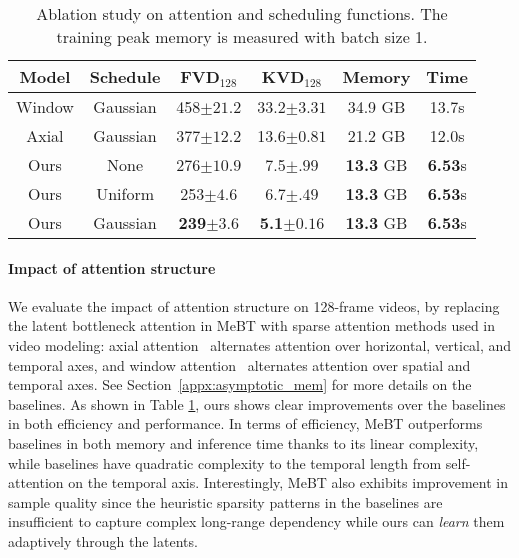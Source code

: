 \documentclass[10pt,twocolumn,letterpaper]{article}
\newcommand{\cutparagraphup}{\vspace*{-0.1in}}
\begin{document}
\begin{table}[t]
\caption{Ablation study on attention and scheduling functions. The training peak memory is measured with batch size 1.}
\label{tab:128f_ablation}
\vspace{-0.3cm}
    \centering
    \footnotesize
    \begin{tabular}{cc|cccc}
    \toprule
        Model & Schedule & FVD$_{128}$ & KVD$_{128}$ & Memory & Time\\
    \midrule
        Window & Gaussian & 458\tiny$\pm21.2$ & 33.2\tiny$\pm3.31$ & 34.9 GB & 13.7s\\
        Axial & Gaussian & 377\tiny$\pm12.2$& 13.6\tiny$\pm0.81$ & 21.2 GB & 12.0s \\
\hline
        Ours & None & 276\tiny{$\pm10.9$} & 7.5\tiny{$\pm.99$} & \textbf{13.3} GB & \textbf{6.53}s\\
        Ours & Uniform & 253\tiny{$\pm4.6$} & 6.7\tiny{$\pm.49$} & \textbf{13.3} GB & \textbf{6.53}s\\
        \hline
        Ours & Gaussian & \textbf{239\tiny${\pm3.6}$} & \textbf{5.1}\tiny$\pm0.16$ & \textbf{13.3} GB & \textbf{6.53}s\\
    \bottomrule
    \end{tabular}
\vspace{-0.5cm}
\end{table}

\cutparagraphup
\paragraph{Impact of attention structure}
We evaluate the impact of attention structure on 128-frame videos, by replacing the latent bottleneck attention in MeBT with sparse attention methods used in video modeling: axial attention~\cite{Ho2019} alternates attention over horizontal, vertical, and temporal axes, and window attention~\cite{MaskViT} alternates attention over spatial and temporal axes.
See Section~\ref{appx:asymptotic_mem} for more details on the baselines.
As shown in Table \ref{tab:128f_ablation}, ours shows clear improvements over the baselines in both efficiency and performance.
In terms of efficiency, MeBT outperforms baselines in both memory and inference time thanks to its linear complexity, while baselines have quadratic complexity to the temporal length from self-attention on the temporal axis.
Interestingly, MeBT also exhibits improvement in sample quality since the heuristic sparsity patterns in the baselines are insufficient to capture complex long-range dependency while ours can \emph{learn} them adaptively through the latents.
\end{document}
